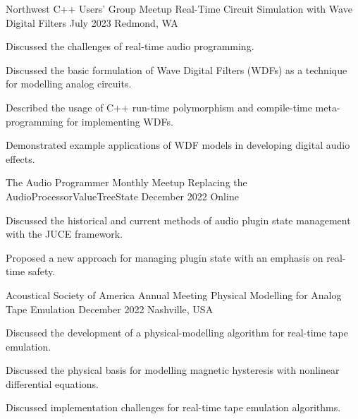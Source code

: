 \begin{cventries}
  \cventry
    {Northwest C++ Users' Group Meetup} %
    {Real-Time Circuit Simulation with Wave Digital Filters} %
    {July 2023} %
    {Redmond, WA} %
    {
      \begin{cvitems} %
        \item {Discussed the challenges of real-time audio programming.}
        \item {Discussed the basic formulation of Wave Digital Filters (WDFs) as a technique for modelling analog circuits.}
        \item {Described the usage of C++ run-time polymorphism and compile-time meta-programming for implementing WDFs.}
        \item {Demonstrated example applications of WDF models in developing digital audio effects.}
      \end{cvitems}
    }

  \cventry
    {The Audio Programmer Monthly Meetup} %
    {Replacing the AudioProcessorValueTreeState} %
    {December 2022} %
    {Online} %
    {
      \begin{cvitems} %
        \item {Discussed the historical and current methods of audio plugin state management with the JUCE framework.}
        \item {Proposed a new approach for managing plugin state with an emphasis on real-time safety.}
      \end{cvitems}
    }


  \cventry
    {Acoustical Society of America Annual Meeting} %
    {Physical Modelling for Analog Tape Emulation} %
    {December 2022} %
    {Nashville, USA} %
    {
      \begin{cvitems} %
        \item {Discussed the development of a physical-modelling algorithm for real-time tape emulation.}
        \item {Discussed the physical basis for modelling magnetic hysteresis with nonlinear differential equations.}
        \item {Discussed implementation challenges for real-time tape emulation algorithms.}
      \end{cvitems}
    }


\end{cventries}
